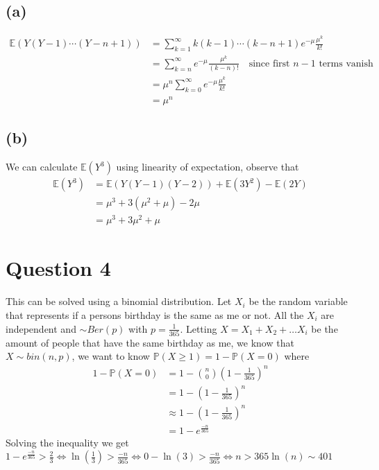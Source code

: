 \documentclass[a4paper,11pt]{article}
\newcommand{\expec}{\mathbb{E}}
\newcommand{\prob}{\mathbb{P}}
\begin{document}
\subsection*{(a)}
\begin{align*}
	\expec(Y(Y-1)\cdots (Y-n+1)) &= \sum_{k=1}^\infty k(k-1)\cdots(k-n+1)e^{-\mu}\frac{\mu^k}{k!} \\
				     &= \sum_{k=n}^\infty e^{-\mu} \frac{\mu^k}{(k-n)!} \quad \text{since first $n-1$ terms vanish} \\
				     &= \mu^n \sum_{k=0}^\infty e^{-\mu}\frac{\mu^k}{k!} \\
				     &= \mu^n
\end{align*}
\subsection*{(b)}
We can calculate $\expec(Y^3)$ using linearity of expectation, observe that 
\begin{align*}
	\expec(Y^3) &= \expec(Y(Y-1)(Y-2)) + \expec(3Y^2) - \expec(2Y) \\
		    &= \mu^3 + 3(\mu^2 + \mu) - 2\mu \\
		    &= \mu^3 + 3\mu^2 + \mu
\end{align*}

\clearpage

\section*{Question 4}
This can be solved using a binomial distribution. Let $X_i$ be the random variable that represents if a persons birthday is the same as me or not. All the $X_i$ are independent and $\sim Ber(p)$ with $p = \frac{1}{365}$. Letting $X = X_1 + X_2 + \ldots X_i$ be the amount of people that have the same birthday as me, we know that $X \sim bin(n,p)$, we want to know $\mathbb{P}(X\geq 1) = 1- \prob(X=0)$
where
\begin{align*}
	1 - \prob(X = 0) &= 1 - \binom{n}{0} (1-\frac{1}{365})^n \\
			 &= 1 - (1-\frac{1}{365})^n \\
			 &\approx 1 - (1-\frac{1}{365})^n \\
			 &= 1 - e^{\frac{-n}{365}}
\end{align*}
Solving the inequality we get $1 - e^{\frac{-n}{365}} > \frac{2}{3} \iff \ln(\frac{1}{3}) > \frac{-n}{365} \iff 0 - \ln(3) > \frac{-n}{365} \iff n > 365\ln(n) \sim 401$
\clearpage
\end{document}
